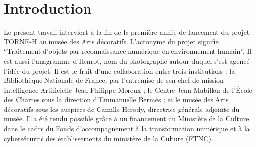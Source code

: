 \documentclass[12pt,twoside]{book}
\begin{document}
\printbibliography[keyword=Archives, title=Archives, heading=firstlevel]
\clearpage
\printbibliography[keyword=Articles, title=Articles, heading=firstlevel]
\printbibliography[keyword=Po, title=Discours politiques et interviews, heading=firstlevel]
\printbibliography[keyword=Législation, title=Législation, heading=firstlevel]
\printbibliography[keyword=Monographies, title=Monographies, heading=firstlevel]
\printbibliography[keyword=Th, title=Thèses et mémoires, heading=secondlevel]
\printbibliography[keyword=Sites web, title=Sites web, heading=firstlevel]
\printbibliography[keyword=Vid, title=Vidéos, heading=firstlevel]


	
\chapter{Introduction}

Le présent travail intervient à la fin de la première année de lancement du projet TORNE-H au musée des Arts décoratifs. L'acronyme du projet signifie \enquote{Traitement d'objets par reconnaissance numérique en environnement humain}. Il est aussi l'anagramme d'Henrot, nom du photographe autour duquel s'est agencé l'idée du projet. Il est le fruit d'une collaboration entre trois institutions : la Bibliothèque Nationale de France, par l'entremise de son chef de mission Intelligence Artificielle Jean-Philippe Moreux ; le Centre Jean Mabillon de l'École des Chartes sous la direction d'Emmanuelle Bermès ; et le musée des Arts décoratifs sous les auspices de Camille Herody, directrice générale adjointe du musée. Il a été rendu possible grâce à un financement du Ministère de la Culture dans le cadre du Fonds d’accompagnement à la transformation numérique et à la cybersécurité des établissements du ministère de la Culture (FTNC). 
\end{document}
